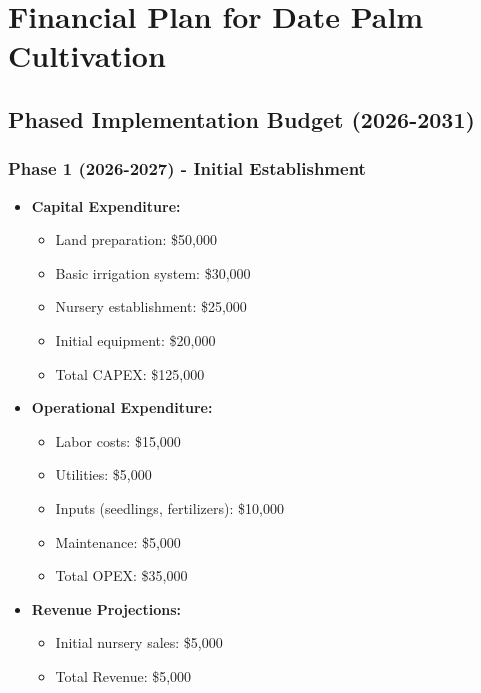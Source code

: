 \section{Financial Plan for Date Palm Cultivation}

\subsection{Phased Implementation Budget (2026-2031)}

\subsubsection{Phase 1 (2026-2027) - Initial Establishment}
\begin{itemize}
    \item \textbf{Capital Expenditure:}
    \begin{itemize}
        \item Land preparation: \$50,000
        \item Basic irrigation system: \$30,000
        \item Nursery establishment: \$25,000
        \item Initial equipment: \$20,000
        \item Total CAPEX: \$125,000
    \end{itemize}
    \item \textbf{Operational Expenditure:}
    \begin{itemize}
        \item Labor costs: \$15,000
        \item Utilities: \$5,000
        \item Inputs (seedlings, fertilizers): \$10,000
        \item Maintenance: \$5,000
        \item Total OPEX: \$35,000
    \end{itemize}
    \item \textbf{Revenue Projections:}
    \begin{itemize}
        \item Initial nursery sales: \$5,000
        \item Total Revenue: \$5,000
    \end{itemize}
\end{itemize}

